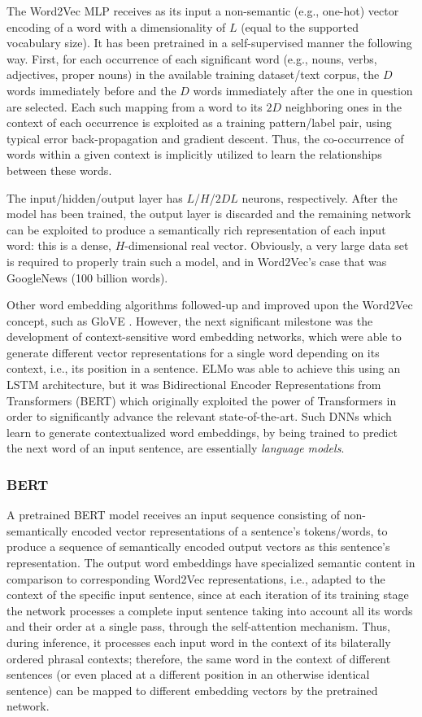 \documentclass[preprint,review,12pt]{elsarticle}
\begin{document}
The Word2Vec MLP receives as its input a non-semantic (e.g., one-hot) vector encoding of a word with a dimensionality of $L$ (equal to the supported vocabulary size). It has been pretrained in a self-supervised manner the following way. First, for each occurrence of each significant word (e.g., nouns, verbs, adjectives, proper nouns) in the available training dataset/text corpus, the $D$ words immediately before and the $D$ words immediately after the one in question are selected. Each such mapping from a word to its $2D$ neighboring ones in the context of each occurrence is exploited as a training pattern/label pair, using typical error back-propagation and gradient descent. Thus, the co-occurrence of words within a given context is implicitly utilized to learn the relationships between these words.

The input/hidden/output layer has $L$/$H$/$2DL$ neurons, respectively. After the model has been trained, the output layer is discarded and the remaining network can be exploited to produce a semantically rich representation of each input word: this is a dense, $H$-dimensional real vector. Obviously, a very large data set is required to properly train such a model, and in Word2Vec's case that was GoogleNews (100 billion words).

Other word embedding algorithms followed-up and improved upon the Word2Vec concept, such as GloVE \cite{glove}. However, the next significant milestone was the development of context-sensitive word embedding networks, which were able to generate different vector representations for a single word depending on its context, i.e., its position in a sentence. ELMo \cite{elmo} was able to achieve this using an LSTM architecture, but it was Bidirectional Encoder Representations from Transformers (BERT) \cite{toutanova} which originally exploited the power of Transformers in order to significantly advance the relevant state-of-the-art. Such DNNs which learn to generate contextualized word embeddings, by being trained to predict the next word of an input sentence, are essentially \textit{language models}.

\subsubsection{BERT}
A pretrained BERT model receives an input sequence consisting of non-semantically encoded vector representations of a sentence's tokens/words, to produce a sequence of semantically encoded output vectors as this sentence's representation. The output word embeddings have specialized semantic content in comparison to corresponding Word2Vec representations, i.e., adapted to the context of the specific input sentence, since at each iteration of its training stage the network processes a complete input sentence taking into account all its words and their order at a single pass, through the self-attention mechanism. Thus, during inference, it processes each input word in the context of its bilaterally ordered phrasal contexts; therefore, the same word in the context of different sentences (or even placed at a different position in an otherwise identical sentence) can be mapped to different embedding vectors by the pretrained network.
\end{document}
